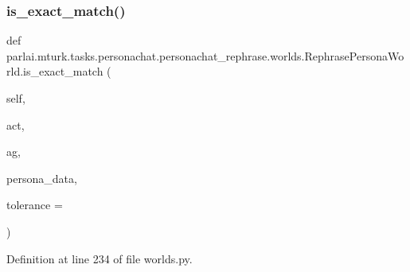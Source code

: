 \subsubsection{\texorpdfstring{is\+\_\+exact\+\_\+match()}{is\_exact\_match()}}
{\footnotesize\ttfamily def parlai.\+mturk.\+tasks.\+personachat.\+personachat\+\_\+rephrase.\+worlds.\+Rephrase\+Persona\+World.\+is\+\_\+exact\+\_\+match (\begin{DoxyParamCaption}\item[{}]{self,  }\item[{}]{act,  }\item[{}]{ag,  }\item[{}]{persona\+\_\+data,  }\item[{}]{tolerance = {} }\end{DoxyParamCaption})}



Definition at line 234 of file worlds.\+py.


